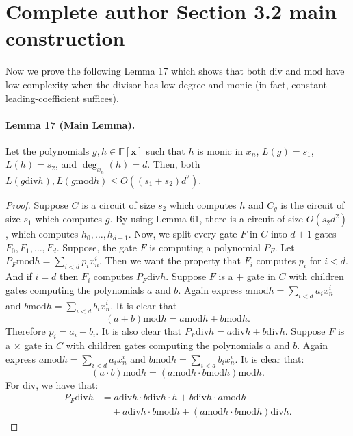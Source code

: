 \section*{Complete author Section 3.2 main construction}
Now we prove the following Lemma 17 which shows that both $\mathrm{div}$ and $\mathrm{mod}$ have low complexity when the divisor has low-degree and monic (in fact, constant leading-coefficient suffices).
\paragraph{Lemma 17 (Main Lemma).} Let the polynomials $g,h\in\mathbb F[\mathbf x]$ such that $h$ is monic in $x_n$, $L(g)=s_1$, $L(h)=s_2$, and $\deg_{x_n}(h)=d$. Then, both $L(g\mathbin{\mathrm{div}}h),L(g\mathbin{\mathrm{mod}}h)\le O((s_1+s_2)d^2)$.
\begin{proof}Suppose $C$ is a circuit of size $s_2$ which computes $h$ and $C_g$ is the circuit of size $s_1$ which computes $g$. By using Lemma 61, there is a circuit of size $O(s_2d^2)$, which computes $h_0,\ldots,h_{d-1}$. Now, we split every gate $F$ in $C$ into $d+1$ gates $F_0,F_1,\ldots,F_d$. Suppose, the gate $F$ is computing a polynomial $P_F$. Let $P_F\mathbin{\mathrm{mod}}h=\sum_{i<d}p_ix_n^i$. Then we want the property that $F_i$ computes $p_i$ for $i<d$. And if $i=d$ then $F_i$ computes $P_F\mathbin{\mathrm{div}}h$.
Suppose $F$ is a $+$ gate in $C$ with children gates computing the polynomials $a$ and $b$. Again express $a\mathbin{\mathrm{mod}}h=\sum_{i<d}a_ix_n^i$ and $b\mathbin{\mathrm{mod}}h=\sum_{i<d}b_ix_n^i$. It is clear that
\[(a+b)\mathbin{\mathrm{mod}}h=a\mathbin{\mathrm{mod}}h+b\mathbin{\mathrm{mod}}h.\]
Therefore $p_i=a_i+b_i$. It is also clear that $P_F\mathbin{\mathrm{div}}h=a\mathbin{\mathrm{div}}h+b\mathbin{\mathrm{div}}h$.
Suppose $F$ is a $\times$ gate in $C$ with children gates computing the polynomials $a$ and $b$. Again express $a\mathbin{\mathrm{mod}}h=\sum_{i<d}a_ix_n^i$ and $b\mathbin{\mathrm{mod}}h=\sum_{i<d}b_ix_n^i$. It is clear that:
\[(a\cdot b)\mathbin{\mathrm{mod}}h=(a\mathbin{\mathrm{mod}}h\cdot b\mathbin{\mathrm{mod}}h)\mathbin{\mathrm{mod}}h.\]
For $\mathrm{div}$, we have that:
\begin{align*}P_F\mathbin{\mathrm{div}}h&=a\mathbin{\mathrm{div}}h\cdot b\mathbin{\mathrm{div}}h\cdot h+b\mathbin{\mathrm{div}}h\cdot a\mathbin{\mathrm{mod}}h\\&\quad+a\mathbin{\mathrm{div}}h\cdot b\mathbin{\mathrm{mod}}h+(a\mathbin{\mathrm{mod}}h\cdot b\mathbin{\mathrm{mod}}h)\mathbin{\mathrm{div}}h.\end{align*}

\end{proof}
